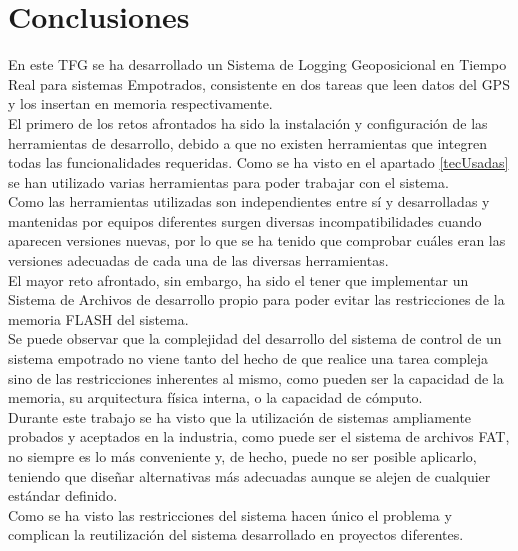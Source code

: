 \chapter{Conclusiones}
\label{chap:conclusiones}

En este \acs{TFG} se ha desarrollado un Sistema de Logging Geoposicional en Tiempo Real para sistemas Empotrados, consistente en dos tareas que leen datos del GPS y los insertan en memoria respectivamente.\\

El primero de los retos afrontados ha sido la instalación y configuración de las herramientas de desarrollo, debido a que no existen herramientas que integren todas las funcionalidades requeridas. Como se ha visto en el apartado \ref{tecUsadas} se han utilizado varias herramientas para poder trabajar con el sistema.\\

Como las herramientas utilizadas son independientes entre sí y desarrolladas y mantenidas por equipos diferentes surgen diversas incompatibilidades cuando aparecen versiones nuevas, por lo que se ha tenido que comprobar cuáles eran las versiones adecuadas de cada una de las diversas herramientas.\\

El mayor reto afrontado, sin embargo, ha sido el tener que implementar un Sistema de Archivos de desarrollo propio para poder evitar las restricciones de la memoria FLASH del sistema.\\

Se puede observar que la complejidad del desarrollo del sistema de control de un sistema empotrado no viene tanto del hecho de que realice una tarea compleja sino de las restricciones inherentes al mismo, como pueden ser la capacidad de la memoria, su arquitectura física interna, o la capacidad de cómputo.\\

Durante este trabajo se ha visto que la utilización de sistemas ampliamente probados y aceptados en la industria, como puede ser el sistema de archivos FAT, no siempre es lo más conveniente y, de hecho, puede no ser posible aplicarlo, teniendo que diseñar alternativas más adecuadas aunque se alejen de cualquier estándar definido.\\

Como se ha visto las restricciones del sistema hacen único el problema y complican la reutilización del sistema desarrollado en proyectos diferentes.\\


